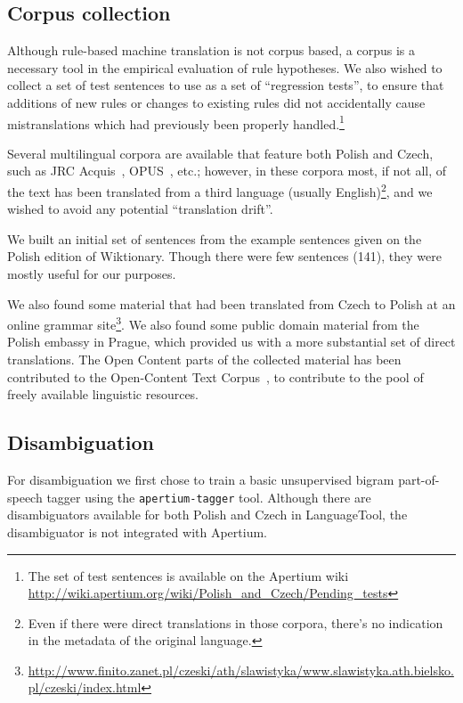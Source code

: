 \documentclass[11pt]{article}
\begin{document}
\subsection{Corpus collection}
\label{sect:corpus}

Although rule-based machine translation is not corpus based, a corpus is a 
necessary tool in the empirical evaluation of rule hypotheses. We also
wished to collect a set of test sentences to use as a set of ``regression 
tests'', to ensure that additions of new rules or changes to existing rules
did not accidentally cause mistranslations which had previously been
properly handled.\footnote{The set of test sentences is available on the
Apertium wiki \url{http://wiki.apertium.org/wiki/Polish_and_Czech/Pending_tests}}

Several multilingual corpora are available that feature both
Polish and Czech, such as JRC Acquis~\citep{Steinberger2006}, 
OPUS~\citep{Tiedemann2009}, etc.; however, in these corpora
most, if not all, of the text has been translated from a third language
(usually English)\footnote{Even if there were direct translations in those 
corpora, there's no indication in the metadata of the original language.}, 
and we wished to avoid any potential ``translation drift''.

We built an initial set of sentences from the example sentences given on
the Polish edition of Wiktionary. Though there were few sentences (141), they
were mostly useful for our purposes.

We also found some material that had been translated from Czech to Polish
at an online grammar 
site\footnote{\url{http://www.finito.zanet.pl/czeski/ath/slawistyka/www.slawistyka.ath.bielsko.pl/czeski/index.html}}. 
We also found some public domain material from
the Polish embassy in Prague, which provided us with a more substantial 
set of direct translations. The Open Content parts of the collected
material has been contributed to the Open-Content Text Corpus~\citep{Banski10}, 
to contribute to the pool of freely available linguistic resources.

\subsection{Disambiguation}

For disambiguation we first chose to train a basic unsupervised bigram
part-of-speech tagger using the {\tt\small apertium-tagger} tool.
Although there are disambiguators available for both Polish and
Czech in LanguageTool, the disambiguator is not integrated with 
Apertium.
\end{document}
